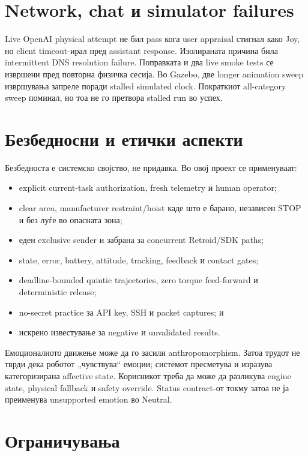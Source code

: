 \section{Network, chat и simulator failures}

Live OpenAI physical attempt не бил pass кога user appraisal стигнал како Joy,
но client timeout-ирал пред assistant response. Изолираната причина била
intermittent DNS resolution failure. Поправката и два live smoke tests се
извршени пред повторна физичка сесија. Во Gazebo, две longer animation sweep
извршувања запреле поради stalled simulated clock. Пократкиот all-category
sweep поминал, но тоа не го претвора stalled run во успех.

\section{Безбедносни и етички аспекти}

Безбедноста е системско својство, не придавка. Во овој проект се применуваат:

\begin{itemize}
  \item explicit current-task authorization, fresh telemetry и human operator;
  \item clear area, manufacturer restraint/hoist каде што е барано, независен
  STOP и без луѓе во опасната зона;
  \item еден exclusive sender и забрана за concurrent Retroid/SDK paths;
  \item state, error, battery, attitude, tracking, feedback и contact gates;
  \item deadline-bounded quintic trajectories, zero torque feed-forward и
  deterministic release;
  \item no-secret practice за API key, SSH и packet captures; и
  \item искрено известување за negative и unvalidated results.
\end{itemize}

Емоционалното движење може да го засили anthropomorphism. Затоа трудот не
тврди дека роботот „чувствува“ емоции; системот пресметува и изразува
категоризирана affective state. Корисникот треба да може да разликува engine
state, physical fallback и safety override. Status contract-от токму затоа не
ја преименува unsupported emotion во Neutral.

\section{Ограничувања}

